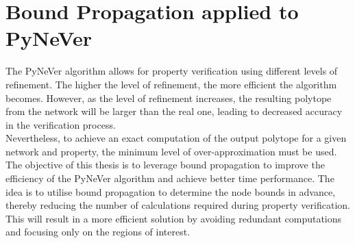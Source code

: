 \section{Bound Propagation applied to PyNeVer}
\label{sec:pynever_application}


The PyNeVer algorithm allows for property verification using different levels of refinement. The higher the level of refinement, the more efficient the algorithm becomes. However, as the level of refinement increases, the resulting polytope from the network will be larger than the real one, leading to decreased accuracy in the verification process.\\
Nevertheless, to achieve an exact computation of the output polytope for a given network and property, the minimum level of over-approximation must be used.\\
The objective of this thesis is to leverage bound propagation to improve the efficiency of the PyNeVer algorithm and achieve better time performance. The idea is to utilise bound propagation to determine the node bounds in advance, thereby reducing the number of calculations required during property verification. This will result in a more efficient solution by avoiding redundant computations and focusing only on the regions of interest.


